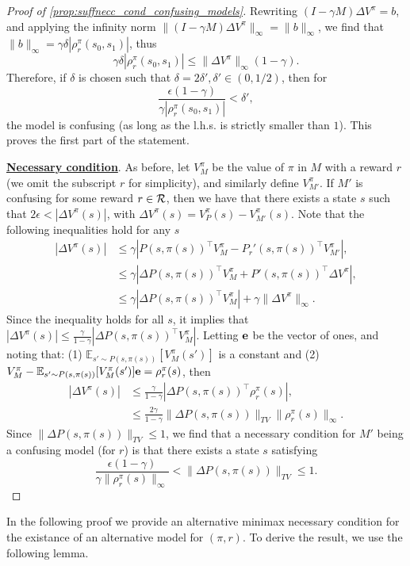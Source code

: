 \begin{proof}[Proof of \cref{prop:suffnecc_cond_confusing_models}]
Rewriting $ (I-\gamma M)\Delta V^\pi = b$, and applying the infinity norm $\|(I-\gamma M)\Delta V^\pi \|_\infty = \|b\|_\infty$, we find that $\|b\|_\infty = \gamma \delta |\rho_r^\pi(s_0,s_1)|$, thus
\[
\gamma \delta |\rho_r^\pi(s_0,s_1)|\leq \|\Delta V^\pi\|_\infty (1-\gamma).
\]
Therefore, if $\delta$ is chosen such that $\delta=2\delta', \delta'\in (0,1/2)$, then for
\[
\frac{\epsilon(1-\gamma)}{\gamma|\rho_r^\pi(s_0,s_1)|} < \delta',
\]
the model is confusing (as long as the l.h.s. is strictly smaller than $1$). This proves the first part of the statement.


\underline{\bf Necessary condition}. As before, let $V_M^\pi$ be the value of $\pi$ in $M$ with a reward $r$ (we omit the subscript $r$ for simplicity), and similarly define $V_{M'}^\pi$.  If $M'$ is confusing for some reward $r\in {\cal R}$, then we have that there exists a state $s$ such that $2\epsilon < |\Delta V^\pi(s)|$, with $\Delta V^\pi(s)=V_P^\pi(s) - V_{M'}^\pi(s)$. Note that the following inequalities hold for any $s$
 \begin{align*}
     |\Delta V^\pi(s)| &\leq \gamma \left|P(s,\pi(s))^\top V_{M}^\pi- P_{r}'(s,\pi(s))^\top V_{M'}^\pi\right|,\\
     &\leq \gamma \left|\Delta P(s,\pi(s))^\top V_{M}^\pi+P'(s,\pi(s))^\top \Delta V^\pi\right| ,\\
     &\leq \gamma  \left|\Delta P(s,\pi(s))^\top V_{M}^\pi\right|  + \gamma \|\Delta V^\pi\|_\infty.
 \end{align*}
Since the inequality holds for all $s$, it implies that $|\Delta V^\pi(s)| \leq \frac{\gamma}{1-\gamma}  \left|\Delta P(s,\pi(s))^\top V_{M}^\pi\right| $. Letting ${\bf e}$ be the vector of ones, and noting that: (1) $\mathbb{E}_{s'\sim P(s,\pi(s))}[V_M^\pi(s')]$ is a constant and (2) $V_{M}^\pi-  \mathbb{E}_{s'\sim P(s,\pi(s))}[V_M^\pi(s')]{\bf e}=\rho_r^\pi(s)$, then
\begin{align*}
    |\Delta V^\pi(s)|& \leq   \frac{\gamma}{1-\gamma}  \left|\Delta P(s,\pi(s))^\top \rho_r^\pi(s)\right|,\\
    &\leq \frac{2\gamma}{1-\gamma}  \|\Delta P(s,\pi(s))\|_{TV} \|\rho_r^\pi(s)\|_\infty.
\end{align*}
Since $\|\Delta P(s,\pi(s))\|_{TV}\leq 1$, we find that  a necessary condition for $M'$ being a confusing model  (for $r$) is that there exists a state $s$ satisfying
\[
\frac{\epsilon(1-\gamma)}{\gamma \|\rho_r^\pi(s)\|_\infty} < \|\Delta P(s,\pi(s))\|_{TV}\leq 1.
\]
\end{proof}
In the following proof we provide an alternative minimax necessary condition for the existance of an alternative model for $(\pi,r)$. To derive the result, we use the following lemma.

